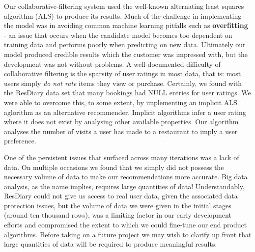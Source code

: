 \documentclass{l3proj}
\begin{document}
Our collaborative-filtering system used the well-known alternating least squares algorithm (ALS) to produce its results. Much of the challenge in implementing the model was in avoiding common machine learning pitfalls such as \textbf{overfitting} - an issue that occurs when the candidate model becomes too dependent on training data and performs poorly when predicting on new data. Ultimately our model produced credible results which the customer was impressed with, but the development was not without problems. A well-documented difficulty of collaborative filtering is the sparsity of user ratings in most data, that is: most users simply \textit{do not rate} items they view or purchase. Certainly, we found with the ResDiary data set that many bookings had NULL entries for user ratings. We were able to overcome this, to some extent, by implementing an implicit ALS aglorithm as an alternative recommender. Implicit algorithms infer a user rating where it does not exist by analysing other available properties. Our algorithm analyses the number of visits a user has made to a restaurant to imply a user preference.

One of the persistent issues that surfaced across many iterations was a lack of data. On multiple occasions we found that we simply did not possess the necessary volume of data to make our recommendations more accurate. Big data analysis, as the name implies, requires large quantities of data! Understandably, ResDiary could not give us access to real user data, given the associated data protection issues, but the volume of data we were given in the initial stages (around ten thousand rows), was a limiting factor in our early development efforts and compromised the extent to which we could fine-tune our end product algorithms. Before taking on a future project we may wish to clarify up front that large quantities of data will be required to produce meaningful results.
\end{document}
